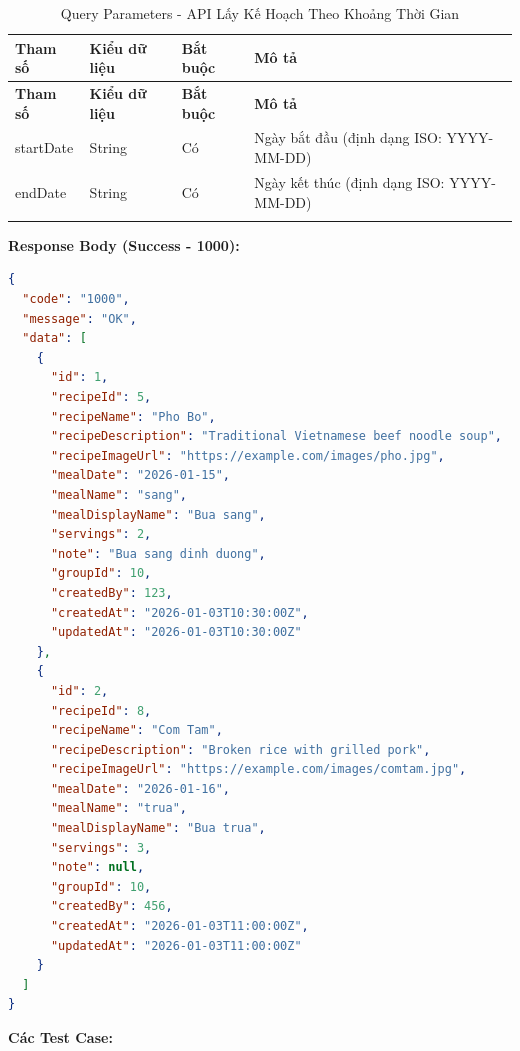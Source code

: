 \small
\begin{longtable}{|>{\raggedright\arraybackslash}p{3cm}|>{\raggedright\arraybackslash}p{2.5cm}|>{\raggedright\arraybackslash}p{2cm}|>{\raggedright\arraybackslash}p{6cm}|}
\hline
\textbf{Tham số} & \textbf{Kiểu dữ liệu} & \textbf{Bắt buộc} & \textbf{Mô tả} \\
\hline
\endfirsthead
\hline
\textbf{Tham số} & \textbf{Kiểu dữ liệu} & \textbf{Bắt buộc} & \textbf{Mô tả} \\
\hline
\endhead
startDate & String & Có & Ngày bắt đầu (định dạng ISO: YYYY-MM-DD) \\
\hline
endDate & String & Có & Ngày kết thúc (định dạng ISO: YYYY-MM-DD) \\
\hline
\caption{Query Parameters - API Lấy Kế Hoạch Theo Khoảng Thời Gian}
\end{longtable}

\textbf{Response Body (Success - 1000):}

\begin{lstlisting}[language=json, caption=Response thanh cong API 2.7]
{
  "code": "1000",
  "message": "OK",
  "data": [
    {
      "id": 1,
      "recipeId": 5,
      "recipeName": "Pho Bo",
      "recipeDescription": "Traditional Vietnamese beef noodle soup",
      "recipeImageUrl": "https://example.com/images/pho.jpg",
      "mealDate": "2026-01-15",
      "mealName": "sang",
      "mealDisplayName": "Bua sang",
      "servings": 2,
      "note": "Bua sang dinh duong",
      "groupId": 10,
      "createdBy": 123,
      "createdAt": "2026-01-03T10:30:00Z",
      "updatedAt": "2026-01-03T10:30:00Z"
    },
    {
      "id": 2,
      "recipeId": 8,
      "recipeName": "Com Tam",
      "recipeDescription": "Broken rice with grilled pork",
      "recipeImageUrl": "https://example.com/images/comtam.jpg",
      "mealDate": "2026-01-16",
      "mealName": "trua",
      "mealDisplayName": "Bua trua",
      "servings": 3,
      "note": null,
      "groupId": 10,
      "createdBy": 456,
      "createdAt": "2026-01-03T11:00:00Z",
      "updatedAt": "2026-01-03T11:00:00Z"
    }
  ]
}
\end{lstlisting}

\textbf{Các Test Case:}


